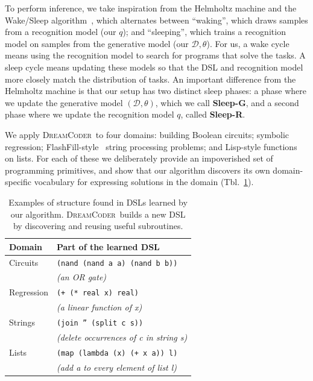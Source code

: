 \documentclass{article}
\newcommand{\system}{\textsc{DreamCoder}~}
\newcommand{\code}[1]{{\footnotesize\texttt{#1}}}
\begin{document}
To perform inference, we take inspiration from the Helmholtz machine and the Wake/Sleep algorithm~\cite{hinton1995wake},
which alternates between ``waking'', which draws samples from a recognition model (our $q$);
and  ``sleeping'', which trains a recognition model on samples from the generative model (our $\mathcal{D},\theta$).
For us, a wake cycle means using the recognition model to search for programs that solve the tasks.
A sleep cycle means  updating these models so that the DSL and  recognition model
more closely match the distribution of tasks.
An important difference from the Helmholtz machine
is that our setup has two distinct sleep phases: a phase where we update the generative model
$(\mathcal{D},\theta)$, which we call \textbf{Sleep-G},
and a second phase where we update the recognition model $q$,
 called \textbf{Sleep-R}.



We apply \system to four domains:
 building Boolean circuits; symbolic regression; FlashFill-style~\cite{gulwani2011automating} string processing problems; and Lisp-style functions on lists.
 For each of these we deliberately provide an impoverished
 set of programming primitives,
 and show that our algorithm discovers
 its own domain-specific vocabulary for expressing solutions in the domain (Tbl.~\ref{initialExampleDSL}).
 \begin{table}
    \begin{tabular}{ll}
   \toprule
   Domain&Part of the learned DSL\\\midrule
   Circuits&\code{(nand (nand a a) (nand b b))}\\
   &\hspace{0.5cm} \emph{(an OR gate)}\\
   Regression& \code{(+ (* real x) real)} \\
      &\hspace{0.5cm} \emph{(a linear function of x)}\\
   Strings& \code{(join '' (split c s))}\\
   &\hspace{0.5cm} \emph{(delete occurrences of c in string s)}\\
   Lists& \code{(map (lambda (x) (+ x a)) l)}\\
   &\hspace{0.5cm} \emph{(add a to every element of list l)}
   \\\bottomrule
    \end{tabular}
    \caption{ Examples of structure found in DSLs  learned by our algorithm. \system builds a new DSL by discovering and reusing useful subroutines.}\label{initialExampleDSL}
 \end{table}
\end{document}
